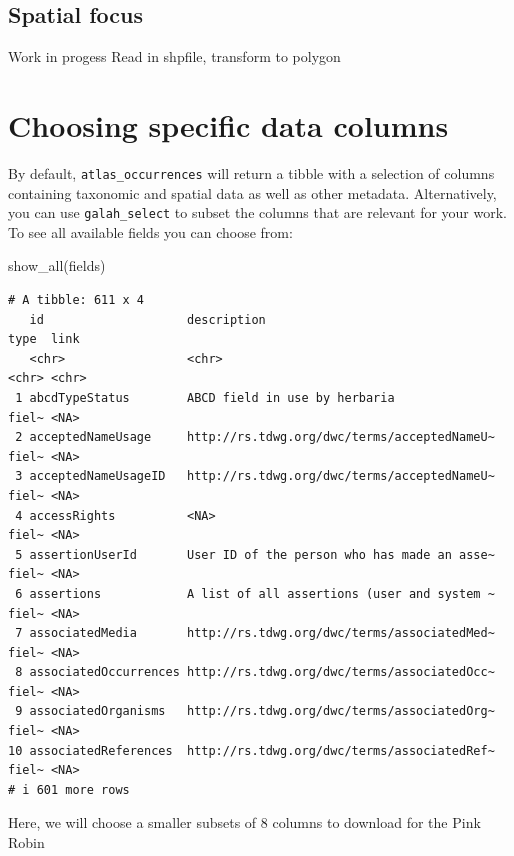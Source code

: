 \documentclass[
  letterpaper,
  DIV=11,
  numbers=noendperiod,
  oneside]{scrreprt}
\newenvironment{Shaded}{\begin{snugshade}}{\end{snugshade}}
\newcommand{\FunctionTok}[1]{\textcolor[rgb]{0.28,0.35,0.67}{#1}}
\newcommand{\NormalTok}[1]{\textcolor[rgb]{0.00,0.23,0.31}{#1}}
\begin{document}
\hypertarget{spatial-focus}{%
\subsection{Spatial focus}\label{spatial-focus}}

Work in progess Read in shpfile, transform to polygon

\hypertarget{choosing-specific-data-columns}{%
\section{Choosing specific data
columns}\label{choosing-specific-data-columns}}

By default, \texttt{atlas\_occurrences} will return a tibble with a
selection of columns containing taxonomic and spatial data as well as
other metadata. Alternatively, you can use \texttt{galah\_select} to
subset the columns that are relevant for your work. To see all available
fields you can choose from:

\begin{Shaded}
\begin{Highlighting}[]
\FunctionTok{show\_all}\NormalTok{(fields) }
\end{Highlighting}
\end{Shaded}

\begin{verbatim}
# A tibble: 611 x 4
   id                    description                                 type  link 
   <chr>                 <chr>                                       <chr> <chr>
 1 abcdTypeStatus        ABCD field in use by herbaria               fiel~ <NA> 
 2 acceptedNameUsage     http://rs.tdwg.org/dwc/terms/acceptedNameU~ fiel~ <NA> 
 3 acceptedNameUsageID   http://rs.tdwg.org/dwc/terms/acceptedNameU~ fiel~ <NA> 
 4 accessRights          <NA>                                        fiel~ <NA> 
 5 assertionUserId       User ID of the person who has made an asse~ fiel~ <NA> 
 6 assertions            A list of all assertions (user and system ~ fiel~ <NA> 
 7 associatedMedia       http://rs.tdwg.org/dwc/terms/associatedMed~ fiel~ <NA> 
 8 associatedOccurrences http://rs.tdwg.org/dwc/terms/associatedOcc~ fiel~ <NA> 
 9 associatedOrganisms   http://rs.tdwg.org/dwc/terms/associatedOrg~ fiel~ <NA> 
10 associatedReferences  http://rs.tdwg.org/dwc/terms/associatedRef~ fiel~ <NA> 
# i 601 more rows
\end{verbatim}

Here, we will choose a smaller subsets of 8 columns to download for the
Pink Robin
\end{document}
